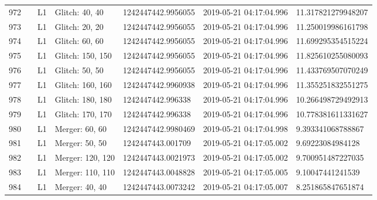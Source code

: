 \begin{longtable}{lllllll}
972  &                                                    &       L1 &    Glitch: 40, 40 &  1242447442.9956055 &  2019-05-21 04:17:04.996 &  11.317821279948207 \\
973  &                                                    &       L1 &    Glitch: 20, 20 &  1242447442.9956055 &  2019-05-21 04:17:04.996 &  11.250019986161798 \\
974  &                                                    &       L1 &    Glitch: 60, 60 &  1242447442.9956055 &  2019-05-21 04:17:04.996 &  11.699295354515224 \\
975  &                                                    &       L1 &  Glitch: 150, 150 &  1242447442.9956055 &  2019-05-21 04:17:04.996 &  11.825610255080093 \\
976  &                                                    &       L1 &    Glitch: 50, 50 &  1242447442.9956055 &  2019-05-21 04:17:04.996 &  11.433769507070249 \\
977  &                                                    &       L1 &  Glitch: 160, 160 &  1242447442.9960938 &  2019-05-21 04:17:04.996 &  11.355251832551275 \\
978  &                                                    &       L1 &  Glitch: 180, 180 &   1242447442.996338 &  2019-05-21 04:17:04.996 &  10.266498729492913 \\
979  &                                                    &       L1 &  Glitch: 170, 170 &   1242447442.996338 &  2019-05-21 04:17:04.996 &  10.778381611331627 \\
980  &                                                    &       L1 &    Merger: 60, 60 &  1242447442.9980469 &  2019-05-21 04:17:04.998 &   9.393341068788867 \\
981  &                                                    &       L1 &    Merger: 50, 50 &   1242447443.001709 &  2019-05-21 04:17:05.002 &    9.69223084984128 \\
982  &                                                    &       L1 &  Merger: 120, 120 &  1242447443.0021973 &  2019-05-21 04:17:05.002 &   9.700951487227035 \\
983  &                                                    &       L1 &  Merger: 110, 110 &  1242447443.0048828 &  2019-05-21 04:17:05.005 &    9.10047441241539 \\
984  &                                                    &       L1 &    Merger: 40, 40 &  1242447443.0073242 &  2019-05-21 04:17:05.007 &   8.251865847651874 \\

\end{longtable}
